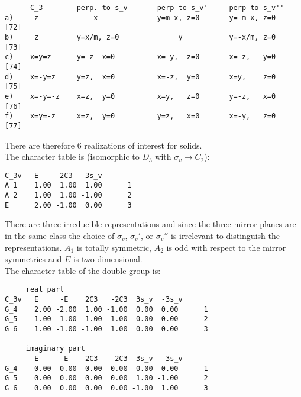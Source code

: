 \documentclass[12pt,a4paper,twoside]{report}
\begin{document}
\begin{tcolorbox}
\begin{footnotesize}
\begin{verbatim}
      C_3        perp. to s_v       perp to s_v'     perp to s_v''
a)     z             x              y=m x, z=0       y=-m x, z=0     [72]
b)     z         y=x/m, z=0              y           y=-x/m, z=0     [73]
c)    x=y=z      y=-z  x=0          x=-y,  z=0       x=-z,   y=0     [74]
d)    x=-y=z     y=z,  x=0          x=-z,  y=0       x=y,    z=0     [75]
e)    x=-y=-z    x=z,  y=0          x=y,   z=0       y=-z,   x=0     [76]
f)    x=y=-z     x=z,  y=0          y=z,   x=0       x=-y,   z=0     [77]
\end{verbatim}
\end{footnotesize}
\end{tcolorbox}

There are therefore $6$ realizations of interest for solids. \\
The character table is (isomorphic to $D_3$ with $\sigma_v \rightarrow C_2$):

\begin{tcolorbox}
\begin{footnotesize}
\begin{verbatim}
C_3v   E     2C3   3s_v
A_1    1.00  1.00  1.00      1
A_2    1.00  1.00 -1.00      2
E      2.00 -1.00  0.00      3
\end{verbatim}
\end{footnotesize}
\end{tcolorbox}

There are three irreducible representations and since the three mirror planes
are in the same class the choice of $\sigma_v$, $\sigma_v'$, or $\sigma_v''$ is
irrelevant to distinguish the representations. $A_1$ is totally symmetric,
$A_2$ is odd with respect to the mirror symmetries and $E$ is two dimensional. \\
The character table of the double group is:

\begin{tcolorbox}
\begin{footnotesize}
\begin{verbatim}
     real part
C_3v   E     -E    2C3   -2C3  3s_v  -3s_v
G_4    2.00 -2.00  1.00 -1.00  0.00  0.00      1
G_5    1.00 -1.00 -1.00  1.00  0.00  0.00      2
G_6    1.00 -1.00 -1.00  1.00  0.00  0.00      3

     imaginary part
       E     -E    2C3   -2C3  3s_v  -3s_v
G_4    0.00  0.00  0.00  0.00  0.00  0.00      1
G_5    0.00  0.00  0.00  0.00  1.00 -1.00      2
G_6    0.00  0.00  0.00  0.00 -1.00  1.00      3
\end{verbatim}
\end{footnotesize}
\end{tcolorbox}
\end{document}
